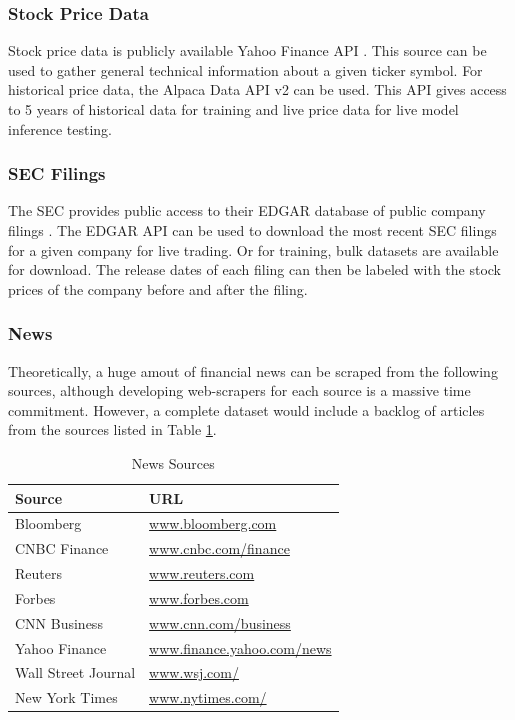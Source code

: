 \documentclass[conference]{IEEEtran}
\begin{document}
\subsubsection{Stock Price Data}
Stock price data is publicly available Yahoo Finance API \cite{yahoofinanceapi}. This source can be used to gather general technical information about a given ticker symbol. 
For historical price data, the Alpaca Data API v2 \cite{alpacadataapi} can be used. This API gives access to 5 years of historical data for training and live price data for live model inference testing. 
\subsubsection{SEC Filings}
The SEC provides public access to their EDGAR database of public company filings \cite{Sec.gov_2021}. The EDGAR API can be used to download the most recent SEC filings for a given company for live trading. Or for training, bulk datasets are available for download. The release dates of each filing can then be labeled with the stock prices of the company before and after the filing.
\subsubsection{News}
Theoretically, a huge amout of financial news can be scraped from the following sources, although developing web-scrapers for each source is a massive time commitment. However, a complete dataset would include a backlog of articles from the sources listed in Table \ref{table:newsSources}.
\begin{table}[ht]
    \caption{News Sources}
    \centering
    \begin{tabular}{|l|l|}
        \hline
        \textbf{Source} & \textbf{URL} \\
        \hline
        Bloomberg & \href{https://www.bloomberg.com/}{www.bloomberg.com} \\
        \hline
        CNBC Finance & \href{https://www.cnbc.com/finance/}{www.cnbc.com/finance} \\
        \hline
        Reuters & \href{https://www.reuters.com/}{www.reuters.com} \\
        \hline
        Forbes & \href{https://www.forbes.com/}{www.forbes.com} \\
        \hline
        CNN Business & \href{https://www.cnn.com/business}{www.cnn.com/business} \\
        \hline
        Yahoo Finance & \href{https://finance.yahoo.com/news}{www.finance.yahoo.com/news} \\
        \hline
        Wall Street Journal & \href{https://www.wsj.com/}{www.wsj.com/} \\
        \hline
		New York Times & \href{https://www.nytimes.com/}{www.nytimes.com/} \\
        \hline
    \end{tabular}
    \label{table:newsSources}
\end{table}
\end{document}
